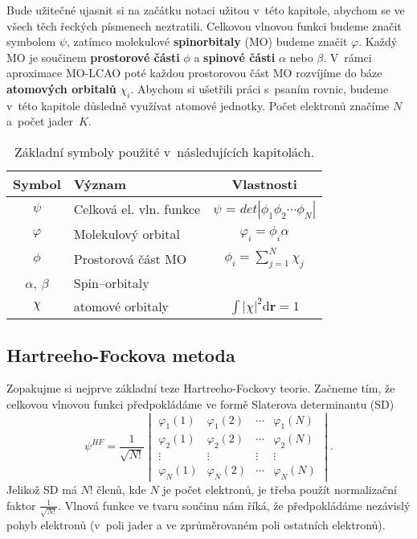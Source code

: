 Bude užitečné ujasnit si na začátku notaci užitou v~této kapitole, abychom se ve všech těch řeckých písmenech neztratili. Celkovou vlnovou funkci budeme značit symbolem $\psi$,  zatímco molekulové \textbf{spinorbitaly} (MO) budeme značit $\varphi$. Každý MO je součinem \textbf{prostorové části} $\phi$ a \textbf{spinové části} $\alpha$ nebo $\beta$. V~rámci aproximace MO-LCAO poté každou prostorovou část MO rozvíjíme do báze \textbf{atomových orbitalů} $\chi_i$. Abychom si ušetřili práci s~psaním rovnic, budeme v~této kapitole důsledně využívat atomové jednotky. Počet elektronů značíme $N$ a~počet jader~$K$.

\begin{table}[ht]
\centering
\caption{Základní symboly použité v~následujících kapitolách.}
\begin{tabular}{|c|l|c|}
\hline 
\rule[-1ex]{0pt}{2.5ex} Symbol & 	Význam	& Vlastnosti \\ 
\hline 
\rule[-1ex]{0pt}{2.5ex} $\psi$ & Celková el. vln. funkce  & $\psi$ = $det|\phi_1 \phi_2 \cdots \phi_N |$ \\ 
\hline 
\rule[-1ex]{0pt}{2.5ex} $\varphi$ & Molekulový orbital & $\varphi_i=\phi_i \alpha $\\ 
\hline 
\rule[-1ex]{0pt}{2.5ex} $\phi$ & Prostorová část MO & $\phi_i=\sum_{j=1}^N \chi_j $ \\ 
\hline 
\rule[-1ex]{0pt}{2.5ex} $\alpha$, $\beta$  & Spin--orbitaly & \\ 
\hline 
\rule[-0ex]{0pt}{2.5ex} $\chi$ & atomové orbitaly & $\int |\chi|^2 \mathrm{d}\textbf{r} = 1 $ \\
\hline
\end{tabular} 
\label{tab:vlnfunkce}
\end{table}

\subsection{Hartreeho-Fockova metoda}

Zopakujme si nejprve základní teze Hartreeho-Fockovy teorie. Začneme tím, že celkovou vlnovou funkci předpokládáme ve formě Slaterova determinantu (SD)
\begin{equation}
\psi^{HF}=\frac{1}{\sqrt{N!}}\begin{vmatrix}
\varphi_1(1) & \varphi_1(2) & \cdots & \varphi_1(N) \\
\varphi_2(1) & \varphi_2(2) & \cdots & \varphi_2(N) \\
\vdots & \vdots & \vdots & \vdots \\
\varphi_N(1) & \varphi_N (2) & \cdots & \varphi_N(N)
\end{vmatrix}.
\end{equation}
Jelikož SD má $N!$ členů, kde $N$ je počet elektronů, je třeba použít normalizační faktor $\frac{1}{\sqrt{N!}}$. Vlnová funkce ve tvaru součinu nám říká, že předpokládáme nezávislý pohyb elektronů (v~poli jader a ve zprůměrovaném poli ostatních elektronů).

